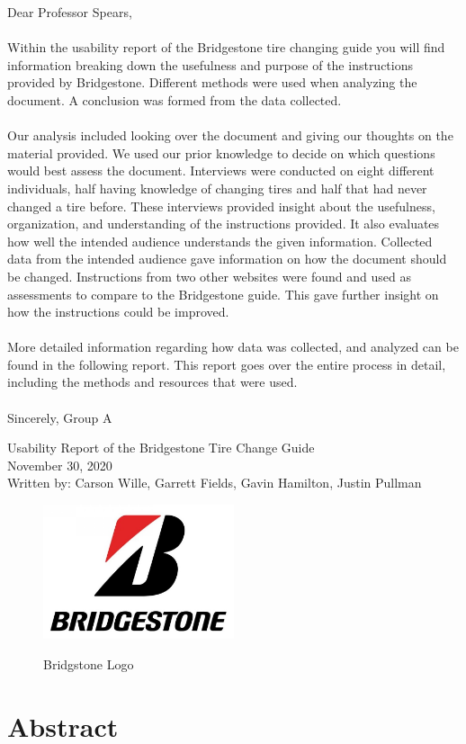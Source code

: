 \documentclass[12pt,A4paper]{article}
\begin{document}
	\noindent
	Dear Professor Spears, \\ \\
	\noindent
	Within the usability report of the Bridgestone tire changing guide you will find information breaking down the usefulness and purpose of the instructions provided by Bridgestone. Different methods were used when analyzing the document. A conclusion was formed from the data collected. \\ 
	\\Our analysis included looking over the document and giving our thoughts on the material provided. We used our prior knowledge to decide  on which questions would best assess the document. Interviews were conducted on eight different individuals, half having knowledge of changing tires and half that had never changed a tire before. These interviews provided insight about the usefulness, organization, and understanding of the instructions provided. It also evaluates how well the intended audience understands the given information. Collected data from the intended audience gave information on how the document should be changed. Instructions from two other websites were found and used as assessments to compare to the Bridgestone guide. This gave further insight on how the instructions could be improved. \\ 
	\\More detailed information regarding how data was collected, and analyzed can be found in the following report. This report goes over the entire process in detail, including the methods and resources that were used.\\ \\Sincerely, Group A
	\thispagestyle{empty}
	\clearpage
	\thispagestyle{empty}
	\begin{center}
		\Huge
		Usability Report of the Bridgestone Tire Change Guide \\
		\vspace{0.25 in}
		\Large
		 November 30, 2020 \\
		 \vspace{0.25 in}
		Written by: Carson Wille, Garrett Fields, Gavin Hamilton, Justin Pullman
		\begin{figure}[!h]
			\centering
			\vspace{0.5 in}
			\includegraphics[width=0.5\textwidth]{logo.jpg}
			\label{fig:f1}
			\caption{Bridgstone Logo}
		\end{figure}
		\vspace*{\fill}
		\section{Abstract}
	\end{center}
\end{document}
